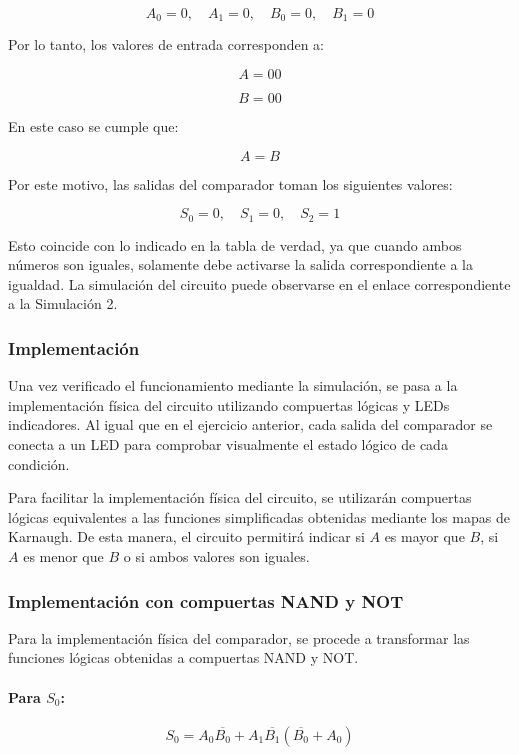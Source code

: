 \documentclass[a4paper,12pt]{article}
\begin{document}
	\[
	A_0 = 0,\quad A_1 = 0,\quad B_0 = 0,\quad B_1 = 0
	\]
	
	Por lo tanto, los valores de entrada corresponden a:
	
	\[
	A = 00
	\]
	
	\[
	B = 00
	\]
	
	En este caso se cumple que:
	
	\[
	A = B
	\]
	
	Por este motivo, las salidas del comparador toman los siguientes valores:
	
	\[
	S_0 = 0,\quad S_1 = 0,\quad S_2 = 1
	\]
	
	Esto coincide con lo indicado en la tabla de verdad, ya que cuando ambos números son
	iguales, solamente debe activarse la salida correspondiente a la igualdad. La simulación
	del circuito puede observarse en el enlace correspondiente a la Simulación 2.
	
	\subsubsection{Implementación}
	
	Una vez verificado el funcionamiento mediante la simulación, se pasa a la implementación
	física del circuito utilizando compuertas lógicas y LEDs indicadores. Al igual que en el
	ejercicio anterior, cada salida del comparador se conecta a un LED para comprobar
	visualmente el estado lógico de cada condición.
	
	Para facilitar la implementación física del circuito, se utilizarán compuertas lógicas
	equivalentes a las funciones simplificadas obtenidas mediante los mapas de Karnaugh.
	De esta manera, el circuito permitirá indicar si $A$ es mayor que $B$, si $A$ es menor
	que $B$ o si ambos valores son iguales.

	
	\subsubsection{Implementación con compuertas NAND y NOT}
	
	Para la implementación física del comparador, se procede a transformar las funciones
	lógicas obtenidas a compuertas NAND y NOT.
	
	\paragraph{Para $S_0$:}
	
	\[
	S_0 = A_0\overline{B_0} + A_1\overline{B_1}(\overline{B_0} + A_0)
	\]
	
\end{document}

